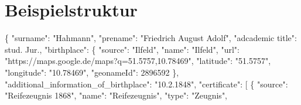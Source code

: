 \documentclass[12pt,a4paper]{article}
\begin{document}
\section{Beispielstruktur}
 \label{sec:Beispielstruktur}
\{
\newline
\hspace*{0.5cm}
"{}surname"{}: "{}Hahmann"{},
\newline
\hspace*{0.5cm}
"{}prename"{}: "{}Friedrich August Adolf"{},
\newline
\hspace*{0.5cm}
"{}adcademic title"{}: stud. Jur.,
\newline
\hspace*{0.5cm}
"{}birthplace"{}: \{
\newline
\hspace*{1cm}
"{}source"{}: "{}Ilfeld"{},
\newline
\hspace*{1cm}
"{}name"{}: "{}Ilfeld"{},
\newline
\hspace*{1cm}
"{}url"{}: "{}https://maps.google.de/maps?q=51.5757,10.78469"{},
\newline
\hspace*{1cm}
"{}latitude"{}: "{}51.5757"{},
\newline
\hspace*{1cm}
"{}longitude"{}: "{}10.78469"{},
\newline
\hspace*{1cm}
"{}geonameId"{}: 2896592
\newline
\hspace*{0.5cm}
\},
\newline
\hspace*{0.5cm}
"{}additional\_information\_of\_birthplace"{}: "{}10.2.1848"{},
\newline
\hspace*{0.5cm}
"{}certificate"{}: [
\newline
\hspace*{1cm}
\{
\newline
\hspace*{1.5cm}
"{}source"{}: "{}Reifezeugnis 1868"{},
\newline
\hspace*{1.5cm}
"{}name"{}: "{}Reifezeugnis"{},
\newline
\hspace*{1.5cm}
"{}type"{}: "{}Zeugnis"{},
\newline
\hspace*{1.5cm}
\end{document}
